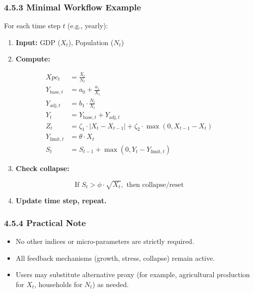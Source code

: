 \documentclass[12pt]{report}
\begin{document}
\subsubsection{4.5.3 Minimal Workflow Example}

For each time step $t$ (e.g., yearly):

\begin{enumerate}
  \item \textbf{Input:} GDP ($X_t$), Population ($N_t$)

  \item \textbf{Compute:}
\end{enumerate}

\leavevmode
\begin{align*}
  Xpc_t &= \frac{X_t}{N_t} \\
  Y_{\text{base},t} &= a_0 + \frac{a_1}{X_t} \\
  Y_{\text{adj},t} &= b_1 \cdot \frac{N_t}{X_t} \\
  Y_t &= Y_{\text{base},t} + Y_{\text{adj},t} \\
  Z_t &= \zeta_1 \cdot |X_t - X_{t-1}| + \zeta_2 \cdot \max(0, X_{t-1} - X_t) \\
  Y_{\text{limit},t} &= \theta \cdot X_t \\
  S_t &= S_{t-1} + \max(0, Y_t - Y_{\text{limit},t})
\end{align*}

\begin{enumerate}
  \setcounter{enumi}{2}  %
  \item \textbf{Check collapse:}
\end{enumerate}

\begin{equation*}
  \text{If } S_t > \phi \cdot \sqrt{X_t}, \text{ then collapse/reset}
\end{equation*}

\begin{enumerate}
  \setcounter{enumi}{3}
  \item \textbf{Update time step, repeat.}
\end{enumerate}



\subsubsection{4.5.4 Practical Note}

\begin{itemize}
  \item No other indices or micro-parameters are strictly required.
  \item All feedback mechanisms (growth, stress, collapse) remain active.
  \item Users may substitute alternative proxy (for example, agricultural production for $X_t$, households for $N_t$) as needed.
\end{itemize}
\end{document}
